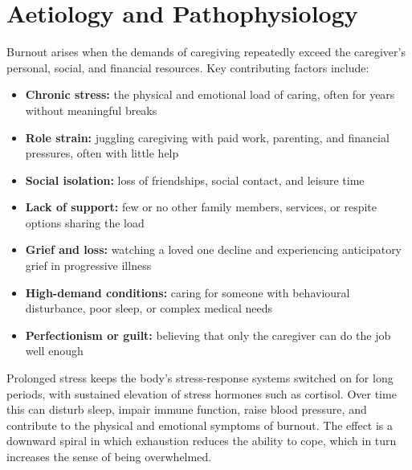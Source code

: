 \section*{Aetiology and Pathophysiology}
Burnout arises when the demands of caregiving repeatedly exceed the caregiver's personal, social, and financial resources. Key contributing factors include:

\begin{itemize}
    \item \textbf{Chronic stress:} the physical and emotional load of caring, often for years without meaningful breaks
    \item \textbf{Role strain:} juggling caregiving with paid work, parenting, and financial pressures, often with little help
    \item \textbf{Social isolation:} loss of friendships, social contact, and leisure time
    \item \textbf{Lack of support:} few or no other family members, services, or respite options sharing the load
    \item \textbf{Grief and loss:} watching a loved one decline and experiencing anticipatory grief in progressive illness
    \item \textbf{High-demand conditions:} caring for someone with behavioural disturbance, poor sleep, or complex medical needs
    \item \textbf{Perfectionism or guilt:} believing that only the caregiver can do the job well enough
\end{itemize}

Prolonged stress keeps the body's stress-response systems switched on for long periods, with sustained elevation of stress hormones such as cortisol. Over time this can disturb sleep, impair immune function, raise blood pressure, and contribute to the physical and emotional symptoms of burnout. The effect is a downward spiral in which exhaustion reduces the ability to cope, which in turn increases the sense of being overwhelmed.

